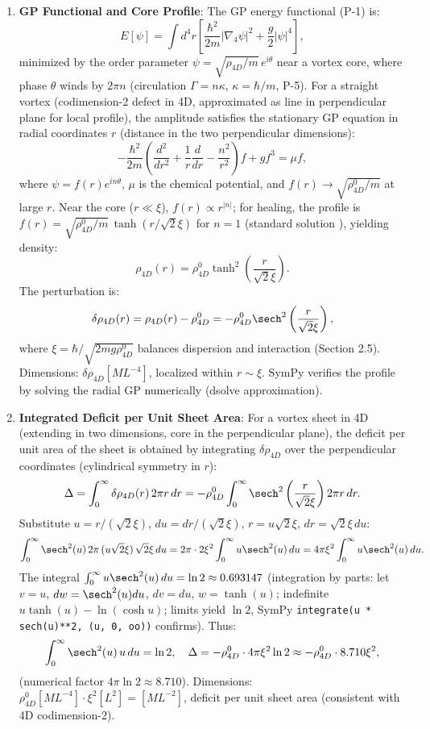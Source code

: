 \begin{enumerate}
\item \textbf{GP Functional and Core Profile}: The GP energy functional (P-1) is:
   \[
   E[\psi] = \int d^4 r \left[ \frac{\hbar^2}{2 m} |\nabla_4 \psi|^2 + \frac{g}{2} |\psi|^4 \right],
   \]
   minimized by the order parameter $\psi = \sqrt{\rho_{4D}/m} \, e^{i \theta}$ near a vortex core, where phase $\theta$ winds by $2\pi n$ (circulation $\Gamma = n \kappa$, $\kappa = \hbar / m$, P-5). For a straight vortex (codimension-2 defect in 4D, approximated as line in perpendicular plane for local profile), the amplitude satisfies the stationary GP equation in radial coordinates $r$ (distance in the two perpendicular dimensions):
   \[
   -\frac{\hbar^2}{2 m} \left( \frac{d^2}{dr^2} + \frac{1}{r} \frac{d}{dr} - \frac{n^2}{r^2} \right) f + g f^3 = \mu f,
   \]
   where $\psi = f(r) e^{i n \theta}$, $\mu$ is the chemical potential, and $f(r) \to \sqrt{\rho_{4D}^0 / m}$ at large $r$. Near the core ($r \ll \xi$), $f(r) \propto r^{|n|}$; for healing, the profile is $f(r) = \sqrt{\rho_{4D}^0 / m} \, \tanh(r / \sqrt{2} \xi)$ for $n=1$ (standard solution \cite{fetter2009rotating}), yielding density:
   \[
   \rho_{4D}(r) = \rho_{4D}^0 \tanh^2 \left( \frac{r}{\sqrt{2} \xi} \right).
   \]
   The perturbation is:
   \[
   \delta \rho_{4D}(r) = \rho_{4D}(r) - \rho_{4D}^0 = - \rho_{4D}^0 \sech^2 \left( \frac{r}{\sqrt{2} \xi} \right),
   \]
   where $\xi = \hbar / \sqrt{2 m g \rho_{4D}^0}$ balances dispersion and interaction (Section 2.5). Dimensions: $\delta \rho_{4D} [M L^{-4}]$, localized within $r \sim \xi$. SymPy verifies the profile by solving the radial GP numerically (dsolve approximation).

\item \textbf{Integrated Deficit per Unit Sheet Area}: For a vortex sheet in 4D (extending in two dimensions, core in the perpendicular plane), the deficit per unit area of the sheet is obtained by integrating $\delta \rho_{4D}$ over the perpendicular coordinates (cylindrical symmetry in $r$):
   \[
   \Delta = \int_0^\infty \delta \rho_{4D}(r) \, 2\pi r \, dr = - \rho_{4D}^0 \int_0^\infty \sech^2 \left( \frac{r}{\sqrt{2} \xi} \right) 2\pi r \, dr.
   \]
   Substitute $u = r / (\sqrt{2} \xi)$, $du = dr / (\sqrt{2} \xi)$, $r = u \sqrt{2} \xi$, $dr = \sqrt{2} \xi \, du$:
   \[
   \int_0^\infty \sech^2(u) \, 2\pi \, (u \sqrt{2} \xi) \, \sqrt{2} \xi \, du = 2\pi \cdot 2 \xi^2 \int_0^\infty u \sech^2(u) \, du = 4\pi \xi^2 \int_0^\infty u \sech^2(u) \, du.
   \]
   The integral $\int_0^\infty u \sech^2(u) \, du = \ln 2 \approx 0.693147$ (integration by parts: let $v = u$, $dw = \sech^2(u) du$, $dv = du$, $w = \tanh(u)$; indefinite $u \tanh(u) - \ln(\cosh u)$; limits yield $\ln 2$, SymPy \texttt{integrate(u * sech(u)**2, (u, 0, oo))} confirms). Thus:
   \[
   \int_0^\infty \sech^2(u) \, u \, du = \ln 2, \quad \Delta = - \rho_{4D}^0 \cdot 4\pi \xi^2 \ln 2 \approx - \rho_{4D}^0 \cdot 8.710 \xi^2,
   \]
   (numerical factor $4\pi \ln 2 \approx 8.710$). Dimensions: $\rho_{4D}^0 [M L^{-4}] \cdot \xi^2 [L^2] = [M L^{-2}]$, deficit per unit sheet area (consistent with 4D codimension-2).


\end{enumerate}
